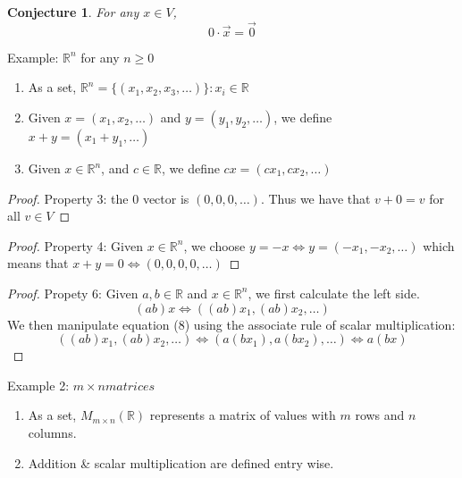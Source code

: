 \documentclass{article}
\newtheorem{conjecture}[theorem]{Conjecture}
\newtheorem{one minute paper}[theorem]{One Minute Paper}
\begin{document}
\begin{conjecture}
    For any $x \in V$, 
    \begin{equation}
        0 \cdot \vec{x} = \vec{0}
    \end{equation}
\end{conjecture}

Example: $\mathbb{R}^n$ for any $n \geq 0$
\begin{enumerate}
    \item As a set, $\mathbb{R}^n = \{(x_1,x_2,x_3,\dots)\}: x_i \in \mathbb{R}$
    \item Given $x = (x_1,x_2,\dots)$ and $y = (y_1,y_2,\dots)$, we define $x + y = (x_1 + y_1, \dots)$ 
    \item Given $x \in \mathbb{R}^n$, and $c \in \mathbb{R}$, we define $cx = (cx_1, cx_2, \dots)$
\end{enumerate}

\begin{proof}
    Property 3: the 0 vector is $(0, 0, 0, \dots)$. Thus we have that $v + 0 = v$ for all $v \in V$
\end{proof}

\begin{proof}
    Property 4: Given $x \in \mathbb{R}^n$, we choose $y = -x \iff y = (-x_1, -x_2, \dots)$ which means that $x + y = 0 \iff (0,0,0,0, \dots)$
\end{proof}

\begin{proof}
    Propety 6: Given $a,b \in \mathbb{R}$ and $x \in \mathbb{R}^n$, we first calculate the left side.
    \begin{equation}
        (ab)x \iff ((ab)x_1, (ab)x_2, \dots)
    \end{equation}
    We then manipulate equation (8) using the associate rule of scalar multiplication:
    \begin{equation}
        ((ab)x_1, (ab)x_2, \dots) \iff (a(bx_1), a(bx_2), \dots) \iff a(bx)
    \end{equation}
\end{proof}

Example 2: $m \times n matrices$
\begin{enumerate}
    \item As a set, $M_{m\times n}(\mathbb{R})$ represents a matrix of values with $m$ rows and $n$ columns. 
    \item Addition \& scalar multiplication are defined entry wise. 
\end{enumerate}
\end{document}
